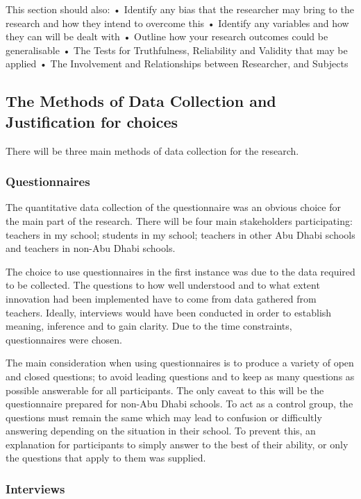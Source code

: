 This section should also:
•	Identify any bias that the researcher may bring to the research and how they intend to overcome this
•	Identify any variables and how they can will be dealt with
•	Outline how your research outcomes could be generalisable
•	The Tests for Truthfulness, Reliability and Validity that may be applied
•	The Involvement and Relationships between Researcher, and Subjects

\subsection{The Methods of Data Collection and Justification for choices}
There will be three main methods of data collection for the research.

\subsubsection{Questionnaires}
The quantitative data collection of the questionnaire was an obvious choice for the main part of the research. There will be four main stakeholders participating: teachers in my school; students in my school; teachers in other Abu Dhabi schools and teachers in non-Abu Dhabi schools. 

The choice to use questionnaires in the first instance was due to the data required to be collected. The questions to how well understood and to what extent innovation had been implemented have to come from data gathered from teachers. Ideally, interviews would have been conducted in order to establish meaning, inference and to gain clarity. Due to the time constraints, questionnaires were chosen. 

The main consideration when using questionnaires is to produce a variety of open and closed questions; to avoid leading questions and to keep as many questions as possible answerable for all participants. The only caveat to this will be the questionnaire prepared for non-Abu Dhabi schools. To act as a control group, the questions must remain the same which may lead to confusion or difficultly answering depending on the situation in their school. To prevent this, an explanation for participants to simply answer to the best of their ability, or only the questions that apply to them was supplied.

\subsubsection{Interviews}

